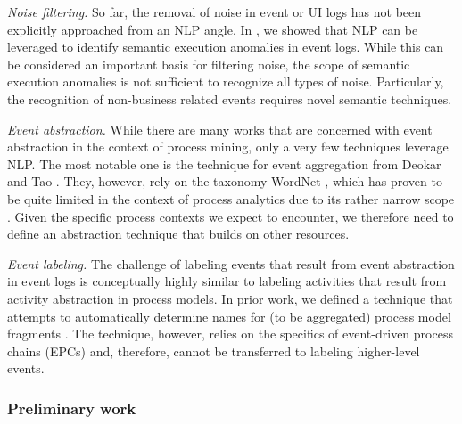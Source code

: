 \textit{Noise filtering.} So far, the removal of noise in event or UI logs has not been explicitly approached from an NLP angle. In \cite{van2021natural}, we showed that NLP can be leveraged to identify semantic execution anomalies in event logs. While this can be considered an important basis for filtering noise, the scope of semantic execution anomalies is not sufficient to recognize all types of noise. Particularly, the recognition of non-business related events requires novel semantic techniques.   
 
 \textit{Event abstraction.} While there are many works that are concerned with event abstraction in the context of process mining, only a very few techniques leverage NLP. The most notable one is the technique for event aggregation from Deokar and Tao \cite{deokar2015semantics}. They, however, rely on the taxonomy WordNet \cite{miller1995wordnet}, which has proven to be quite limited in the context of process analytics due to its rather narrow scope \cite{leopold2015towards}. Given the specific process contexts we expect to encounter, we therefore need to define an abstraction technique that builds on other resources. 
   
\textit{Event labeling.}  The challenge of labeling events that result from event abstraction in event logs is conceptually highly similar to labeling activities that result from activity abstraction in process models. In prior work, we defined a technique that attempts to automatically determine names for (to be aggregated) process model fragments \cite{leopold2014simplifying}. The technique, however, relies on the specifics of event-driven process chains (EPCs) and, therefore, cannot be transferred to labeling higher-level events. 

 \noindent{}

\subsubsection{Preliminary work}



